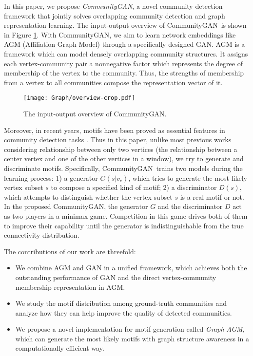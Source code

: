 \documentclass[sigconf]{acmart}
\newcommand{\ComGAN}{CommunityGAN}
\begin{document}
In this paper, we propose \textit{\ComGAN}, a novel community detection framework that jointly solves overlapping community detection and graph representation learning.
The input-output overview of \ComGAN~is shown in Figure \ref{fig:overview}.
With \ComGAN, we aim to learn network embeddings like AGM (Affiliation Graph Model) through a specifically designed GAN.
AGM \cite{yang2012community,yang2013overlapping} is a framework which can model densely overlapping community structures.
It assigns each vertex-community pair a nonnegative factor which represents the degree of membership of the vertex to the community.
Thus, the strengths of membership from a vertex to all communities compose the representation vector of it.

\begin{figure}[]
\texttt{[image: Graph/overview-crop.pdf]}
\caption{The input-output overview of \ComGAN.}
\label{fig:overview}
\end{figure}

Moreover, in recent years, motifs have been proved as essential features in community detection tasks \cite{triangle}.
Thus in this paper, unlike most previous works considering relationship between only two vertices (the relationship between a center vertex and one of the other vertices in a window), we try to generate and discriminate motifs.
Specifically, \ComGAN~trains two models during the learning process:
1) a generator $G(s|v_c)$, which tries to generate the most likely vertex subset $s$ to compose a specified kind of motif;
2) a discriminator $D(s)$, which attempts to distinguish whether the vertex subset $s$ is a real motif or not.
In the proposed \ComGAN, the generator $G$ and the discriminator $D$ act as two players in a minimax game.
Competition in this game drives both of them to improve their capability until the generator is indistinguishable from the true connectivity distribution.

The contributions of our work are threefold:

\begin{itemize}
    \item We combine AGM and GAN in a unified framework, which achieves both the outstanding performance of GAN and the direct vertex-community membership representation in AGM.
    \item We study the motif distribution among ground-truth communities and analyze how they can help improve the quality of detected communities.
    \item We propose a novel implementation for motif generation called \textit{Graph AGM}, which can generate the most likely motifs with graph structure awareness in a computationally efficient way.
\end{itemize}
\end{document}
